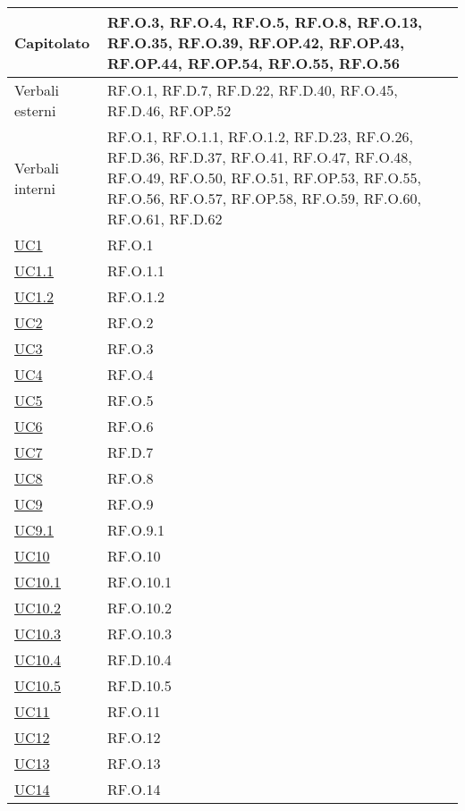\begin{adjustwidth}{-0.5cm}{-0.5cm}
\begin{longtable}{|P{4,5cm}|>{\arraybackslash}P{9cm}|}
    Capitolato & RF.O.3, RF.O.4, RF.O.5, RF.O.8, RF.O.13, RF.O.35, RF.O.39, RF.OP.42, RF.OP.43, RF.OP.44, RF.OP.54, RF.O.55, RF.O.56 \\
    \hline
    Verbali esterni & RF.O.1, RF.D.7, RF.D.22, RF.D.40, RF.O.45, RF.D.46, RF.OP.52 \\
    \hline
    Verbali interni & RF.O.1, RF.O.1.1, RF.O.1.2, RF.D.23, RF.O.26, RF.D.36, RF.D.37, RF.O.41, RF.O.47, RF.O.48, RF.O.49, RF.O.50, RF.O.51, RF.OP.53, RF.O.55, RF.O.56, RF.O.57, RF.OP.58, RF.O.59, RF.O.60, RF.O.61, RF.D.62 \\
    \hline
    \hyperref[UC1]{UC1} & RF.O.1 \\
    \hline
    \hyperref[UC1point1]{UC1.1} & RF.O.1.1 \\
    \hline
    \hyperref[UC1point2]{UC1.2} & RF.O.1.2 \\
    \hline
    \hyperref[UC2]{UC2} & RF.O.2 \\
    \hline
    \hyperref[UC3]{UC3} & RF.O.3 \\
    \hline
    \hyperref[UC4]{UC4} & RF.O.4 \\
    \hline
    \hyperref[UC5]{UC5} & RF.O.5 \\
    \hline
    \hyperref[UC6]{UC6} & RF.O.6 \\
    \hline
    \hyperref[UC7]{UC7} & RF.D.7 \\
    \hline
    \hyperref[UC8]{UC8} & RF.O.8 \\
    \hline
    \hyperref[UC9]{UC9} & RF.O.9 \\
    \hline
    \hyperref[UC9point1]{UC9.1} & RF.O.9.1 \\
    \hline
    \hyperref[UC10]{UC10} & RF.O.10 \\
    \hline
    \hyperref[UC10point1]{UC10.1} & RF.O.10.1 \\ 
    \hline
    \hyperref[UC10point2]{UC10.2} & RF.O.10.2 \\
    \hline
    \hyperref[UC10point3]{UC10.3} & RF.O.10.3 \\
    \hline
    \hyperref[UC10point4]{UC10.4} & RF.D.10.4 \\
    \hline
    \hyperref[UC10point5]{UC10.5} & RF.D.10.5 \\
    \hline
    \hyperref[UC11]{UC11} & RF.O.11 \\
    \hline
    \hyperref[UC12]{UC12} & RF.O.12 \\
    \hline
    \hyperref[UC13]{UC13} & RF.O.13 \\
    \hline
    \hyperref[UC14]{UC14} & RF.O.14 \\

\end{longtable}
\end{adjustwidth}
